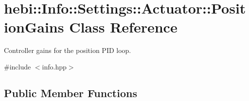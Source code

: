 \hypertarget{classhebi_1_1Info_1_1Settings_1_1Actuator_1_1PositionGains}{}\section{hebi\+:\+:Info\+:\+:Settings\+:\+:Actuator\+:\+:Position\+Gains Class Reference}
\label{classhebi_1_1Info_1_1Settings_1_1Actuator_1_1PositionGains}


Controller gains for the position P\+ID loop.  




{\ttfamily \#include $<$info.\+hpp$>$}

\subsection*{Public Member Functions}
